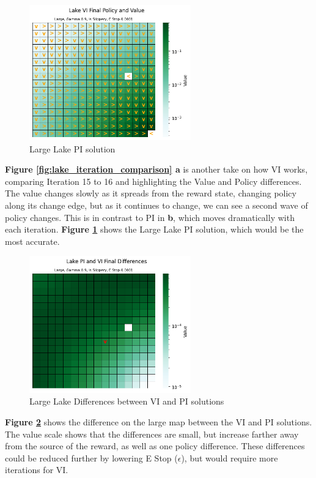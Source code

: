 \documentclass[letterpaper]{article} %
\begin{document}
\begin{figure}[!htb]
\centering
\includegraphics[width=2.75in]{Figures/Lake_VI_Final_Policy_and_Value_Large__Gamma_0_9__Is_Slippery__E_Stop_0_0001.png}
\caption{Large Lake PI solution}
\label{fig:lake_pi_large_solution}
\end{figure}

\textbf{Figure \ref{fig:lake_iteration_comparison} a} is another take on how VI works, comparing Iteration 15 to 16 and highlighting the Value and Policy differences.  The value changes slowly as it spreads from the reward state, changing policy along its change edge, but as it continues to change, we can see a second wave of policy changes.  This is in contrast to PI in \textbf{b}, which moves dramatically with each iteration.  \textbf{Figure \ref{fig:lake_pi_large_solution}} shows the Large Lake PI solution, which would be the most accurate.

\begin{figure}[!htb]
\centering
\includegraphics[width=2.75in]{Figures/Lake_PI_and_VI_Final_Differences_Large__Gamma_0_9__Is_Slippery__E_Stop_0_0001.png}
\caption{Large Lake Differences between VI and PI solutions}
\label{fig:lake_vi_pi_difference}
\end{figure}

\textbf{Figure \ref{fig:lake_vi_pi_difference}} shows the difference on the large map between the VI and PI solutions.  The value scale shows that the differences are small, but increase farther away from the source of the reward, as well as one policy difference.  These differences could be reduced further by lowering E Stop ($\epsilon$), but would require more iterations for VI.
\end{document}
